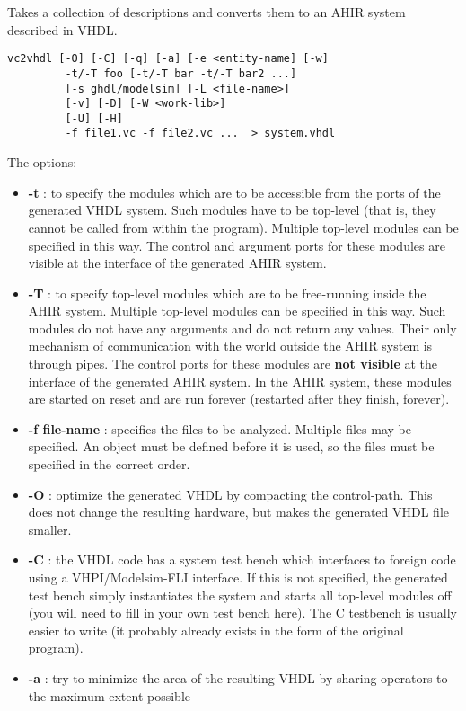 Takes a collection of \vC descriptions and converts them to
an AHIR system described in VHDL.
\begin{verbatim}
vc2vhdl [-O] [-C] [-q] [-a] [-e <entity-name] [-w]
         -t/-T foo [-t/-T bar -t/-T bar2 ...]
         [-s ghdl/modelsim] [-L <file-name>]
         [-v] [-D] [-W <work-lib>]
         [-U] [-H]
         -f file1.vc -f file2.vc ...  > system.vhdl
\end{verbatim}

The options:
\begin{itemize}
\item {\bf -t} : to specify the modules which are to be 
accessible from the ports of the generated VHDL system.
Such modules have to be top-level (that is, they cannot
be called from within the program).
Multiple top-level modules can be specified in this way.
The control and argument ports for these modules are
visible at the interface of the generated AHIR system.
\item {\bf -T} : to specify top-level modules which are to be 
free-running inside the AHIR system.
Multiple top-level modules can be specified in this way.
Such modules do not have any arguments and do not return
any values.  Their only mechanism of communication with
the world outside the AHIR system is through pipes.
The control ports for these modules are
{\bf not visible} at the interface of the generated AHIR system.
In the AHIR system, these modules are started on reset
and are run forever (restarted after they finish, forever).
\item {\bf -f file-name} : specifies the \vC files to be analyzed. 
Multiple \vC files may be specified.  An object must be
defined before it is used, so the \vC files must be 
specified in the correct order.
\item {\bf -O} : optimize the generated VHDL by compacting
the control-path.  This does not change the resulting
hardware, but makes the generated VHDL file smaller.
\item {\bf -C} : the VHDL code has a system test bench which
interfaces to foreign code using a VHPI/Modelsim-FLI interface.
If this is not specified, the  generated test bench simply
instantiates the system and starts all top-level modules
off (you will need to fill in your own test bench here).
The C testbench is usually easier to write (it probably
already exists in the form of the original program).
\item {\bf -a} : try to minimize the area of the resulting
VHDL by sharing operators to the maximum extent possible

\end{itemize}
